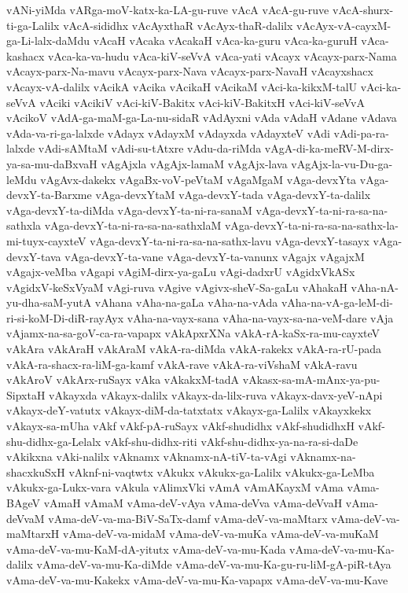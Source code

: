 {vANi-yiMda
vARga-moV-katx-ka-LA-gu-ruve
vAcA
vAcA-gu-ruve
vAcA-shurx-ti-ga-Lalilx
vAcA-sididhx
vAcAyxthaR
vAcAyx-thaR-dalilx
vAcAyx-vA-cayxM-ga-Li-lalx-daMdu
vAcaH
vAcaka
vAcakaH
vAca-ka-guru
vAca-ka-guruH
vAca-kashacx
vAca-ka-va-hudu
vAca-kiV-seVvA
vAca-yati
vAcayx
vAcayx-parx-Nama
vAcayx-parx-Na-mavu
vAcayx-parx-Nava
vAcayx-parx-NavaH
vAcayxshacx
vAcayx-vA-dalilx
vAcikA
vAcika
vAcikaH
vAcikaM
vAci-ka-kikxM-talU
vAci-ka-seVvA
vAciki
vAcikiV
vAci-kiV-Bakitx
vAci-kiV-BakitxH
vAci-kiV-seVvA
vAcikoV
vAdA-ga-maM-ga-La-nu-sidaR
vAdAyxni
vAda
vAdaH
vAdane
vAdava
vAda-va-ri-ga-lalxde
vAdayx
vAdayxM
vAdayxda
vAdayxteV
vAdi
vAdi-pa-ra-lalxde
vAdi-sAMtaM
vAdi-su-tAtxre
vAdu-da-riMda
vAgA-di-ka-meRV-M-dirx-ya-sa-mu-daBxvaH
vAgAjxla
vAgAjx-lamaM
vAgAjx-lava
vAgAjx-la-vu-Du-ga-leMdu
vAgAvx-dakekx
vAgaBx-voV-peVtaM
vAgaMgaM
vAga-devxYta
vAga-devxY-ta-Barxme
vAga-devxYtaM
vAga-devxY-tada
vAga-devxY-ta-dalilx
vAga-devxY-ta-diMda
vAga-devxY-ta-ni-ra-sanaM
vAga-devxY-ta-ni-ra-sa-na-sathxla
vAga-devxY-ta-ni-ra-sa-na-sathxlaM
vAga-devxY-ta-ni-ra-sa-na-sathx-la-mi-tuyx-cayxteV
vAga-devxY-ta-ni-ra-sa-na-sathx-lavu
vAga-devxY-tasayx
vAga-devxY-tava
vAga-devxY-ta-vane
vAga-devxY-ta-vanunx
vAgajx
vAgajxM
vAgajx-veMba
vAgapi
vAgiM-dirx-ya-gaLu
vAgi-dadxrU
vAgidxVkASx
vAgidxV-keSxVyaM
vAgi-ruva
vAgive
vAgivx-sheV-Sa-gaLu
vAhakaH
vAha-nA-yu-dha-saM-yutA
vAhana
vAha-na-gaLa
vAha-na-vAda
vAha-na-vA-ga-leM-di-ri-si-koM-Di-diR-rayAyx
vAha-na-vayx-sana
vAha-na-vayx-sa-na-veM-dare
vAja
vAjamx-na-sa-goV-ca-ra-vapapx
vAkApxrXNa
vAkA-rA-kaSx-ra-mu-cayxteV
vAkAra
vAkAraH
vAkAraM
vAkA-ra-diMda
vAkA-rakekx
vAkA-ra-rU-pada
vAkA-ra-shacx-ra-liM-ga-kamf
vAkA-rave
vAkA-ra-viVshaM
vAkA-ravu
vAkAroV
vAkArx-ruSayx
vAka
vAkakxM-tadA
vAkasx-sa-mA-mAnx-ya-pu-SipxtaH
vAkayxda
vAkayx-dalilx
vAkayx-da-lilx-ruva
vAkayx-davx-yeV-nApi
vAkayx-deY-vatutx
vAkayx-diM-da-tatxtatx
vAkayx-ga-Lalilx
vAkayxkekx
vAkayx-sa-mUha
vAkf
vAkf-pA-ruSayx
vAkf-shudidhx
vAkf-shudidhxH
vAkf-shu-didhx-ga-Lelalx
vAkf-shu-didhx-riti
vAkf-shu-didhx-ya-na-ra-si-daDe
vAkikxna
vAki-nalilx
vAknamx
vAknamx-nA-tiV-ta-vAgi
vAknamx-na-shacxkuSxH
vAknf-ni-vaqtwtx
vAkukx
vAkukx-ga-Lalilx
vAkukx-ga-LeMba
vAkukx-ga-Lukx-vara
vAkula
vAlimxVki
vAmA
vAmAKayxM
vAma
vAma-BAgeV
vAmaH
vAmaM
vAma-deV-vAya
vAma-deVva
vAma-deVvaH
vAma-deVvaM
vAma-deV-va-ma-BiV-SaTx-damf
vAma-deV-va-maMtarx
vAma-deV-va-maMtarxH
vAma-deV-va-midaM
vAma-deV-va-muKa
vAma-deV-va-muKaM
vAma-deV-va-mu-KaM-dA-yitutx
vAma-deV-va-mu-Kada
vAma-deV-va-mu-Ka-dalilx
vAma-deV-va-mu-Ka-diMde
vAma-deV-va-mu-Ka-gu-ru-liM-gA-piR-tAya
vAma-deV-va-mu-Kakekx
vAma-deV-va-mu-Ka-vapapx
vAma-deV-va-mu-Kave
}
